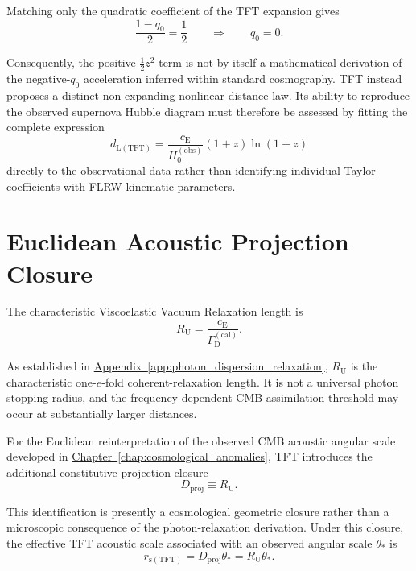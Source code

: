Matching only the quadratic coefficient of the TFT expansion gives
\begin{equation}
    \frac{1-q_0}{2}
    =
    \frac{1}{2}
    \qquad\Longrightarrow\qquad
    q_0=0.
\end{equation}

Consequently, the positive $\frac{1}{2}z^2$ term is not by itself a mathematical derivation of the negative-$q_0$ acceleration inferred within standard cosmography. TFT instead proposes a distinct non-expanding nonlinear distance law. Its ability to reproduce the observed supernova Hubble diagram must therefore be assessed by fitting the complete expression
\begin{equation}
    d_{\mathrm{L(TFT)}}
    =
    \frac{c_{\mathrm{E}}}{H_0^{(\mathrm{obs})}}
    (1+z)\ln(1+z)
\end{equation}
directly to the observational data rather than identifying individual Taylor coefficients with FLRW kinematic parameters.

\section{Euclidean Acoustic Projection Closure}
\label{sec:euclidean_acoustic_projection_closure}

The characteristic Viscoelastic Vacuum Relaxation length is
\begin{equation}
    R_{\mathrm{U}}
    =
    \frac{c_{\mathrm{E}}}
    {\Gamma_{\mathrm{D}}^{(\mathrm{cal})}}.
\end{equation}

As established in \hyperref[app:photon_dispersion_relaxation]{Appendix~\ref*{app:photon_dispersion_relaxation}}, $R_{\mathrm{U}}$ is the characteristic one-$e$-fold coherent-relaxation length. It is not a universal photon stopping radius, and the frequency-dependent CMB assimilation threshold may occur at substantially larger distances.

For the Euclidean reinterpretation of the observed CMB acoustic angular scale developed in \hyperref[chap:cosmological_anomalies]{Chapter~\ref*{chap:cosmological_anomalies}}, TFT introduces the additional constitutive projection closure
\begin{equation}
    D_{\mathrm{proj}}
    \equiv
    R_{\mathrm{U}}.
\end{equation}

This identification is presently a cosmological geometric closure rather than a microscopic consequence of the photon-relaxation derivation. Under this closure, the effective TFT acoustic scale associated with an observed angular scale $\theta_*$ is
\begin{equation}
    r_{\mathrm{s(TFT)}}
    =
    D_{\mathrm{proj}}\theta_*
    =
    R_{\mathrm{U}}\theta_*.
\end{equation}

